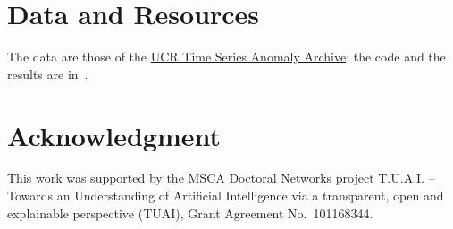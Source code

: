 \documentclass[conference]{IEEEtran}
\begin{document}
\section*{Data and Resources}
The data are those of the \href{https://www.cs.ucr.edu/\%7Eeamonn/time_series_data_2018/UCR_TimeSeriesAnomalyDatasets2021.zip}{UCR Time Series Anomaly Archive}; the code and the results are in~\cite{schiavo2026fedtimevqvae}.

\section*{Acknowledgment}

This work was supported by the MSCA Doctoral Networks project T.U.A.I. -- Towards an Understanding of Artificial Intelligence via a transparent, open and explainable perspective (TUAI), Grant Agreement No.~101168344.

%


\end{document}
